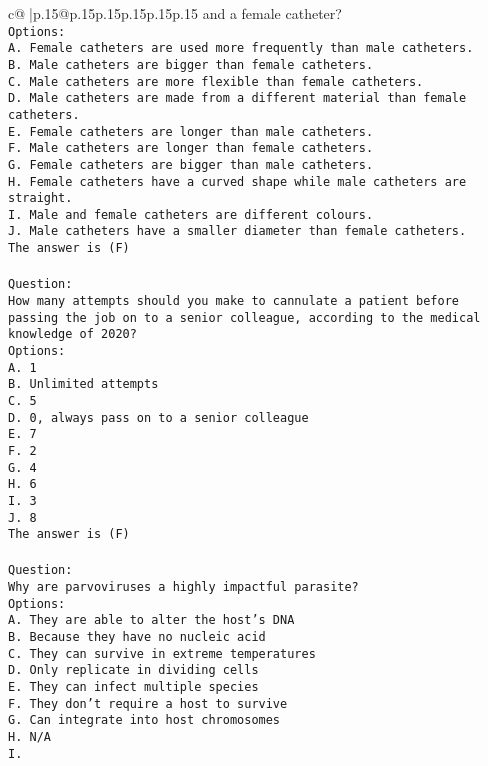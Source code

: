 \documentclass{article}
\begin{document}
{\begin{supertabular}{c@{$\;$}|p{.15\linewidth}@{}p{.15\linewidth}p{.15\linewidth}p{.15\linewidth}p{.15\linewidth}p{.15\linewidth}}
{{{and a female catheter?\\ \tt Options:\\ \tt A. Female catheters are used more frequently than male catheters.\\ \tt B. Male catheters are bigger than female catheters.\\ \tt C. Male catheters are more flexible than female catheters.\\ \tt D. Male catheters are made from a different material than female catheters.\\ \tt E. Female catheters are longer than male catheters.\\ \tt F. Male catheters are longer than female catheters.\\ \tt G. Female catheters are bigger than male catheters.\\ \tt H. Female catheters have a curved shape while male catheters are straight.\\ \tt I. Male and female catheters are different colours.\\ \tt J. Male catheters have a smaller diameter than female catheters.\\ \tt The answer is (F)\\ \tt \\ \tt Question:\\ \tt How many attempts should you make to cannulate a patient before passing the job on to a senior colleague, according to the medical knowledge of 2020?\\ \tt Options:\\ \tt A. 1\\ \tt B. Unlimited attempts\\ \tt C. 5\\ \tt D. 0, always pass on to a senior colleague\\ \tt E. 7\\ \tt F. 2\\ \tt G. 4\\ \tt H. 6\\ \tt I. 3\\ \tt J. 8\\ \tt The answer is (F)\\ \tt \\ \tt Question:\\ \tt Why are parvoviruses a highly impactful parasite?\\ \tt Options:\\ \tt A. They are able to alter the host's DNA\\ \tt B. Because they have no nucleic acid\\ \tt C. They can survive in extreme temperatures\\ \tt D. Only replicate in dividing cells\\ \tt E. They can infect multiple species\\ \tt F. They don't require a host to survive\\ \tt G. Can integrate into host chromosomes\\ \tt H. N/A\\ \tt I. }}}
\end{supertabular}}
\end{document}
